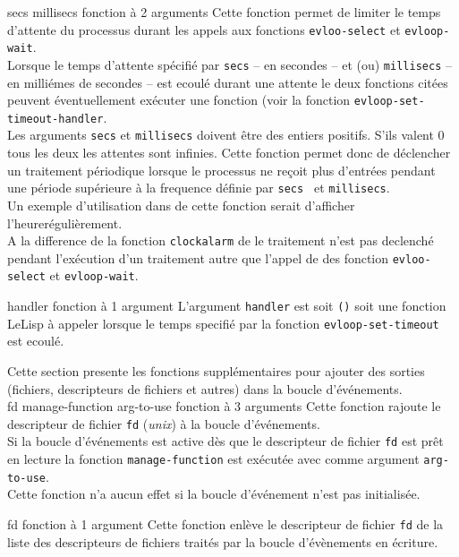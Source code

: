 {secs millisecs} {fonction \`{a} 2 arguments}
Cette fonction permet de limiter le temps d'attente du processus durant les
appels aux fonctions {\tt evloo-select} et {\tt evloop-wait}.\\
Lorsque le temps d'attente sp\'{e}cifi\'{e} par {\tt secs} -- en secondes -- et (ou)
{\tt millisecs} -- en milli\'{e}mes de secondes -- est ecoul\'{e} durant une attente
le deux fonctions cit\'{e}es peuvent \'{e}ventuellement ex\'{e}cuter une fonction
(voir la fonction {\tt evloop-set-timeout-handler}.\\
Les arguments {\tt secs} et {\tt millisecs} doivent \^{e}tre des entiers 
positifs. S'ils valent 0 tous les deux les attentes sont infinies.
Cette fonction permet donc de d\'{e}clencher un traitement p\'{e}riodique lorsque
le processus ne re\c{c}oit plus d'entr\'{e}es pendant une p\'{e}riode sup\'{e}rieure 
\`{a} la frequence d\'{e}finie par {\tt secs } et {\tt millisecs}.\\
Un exemple d'utilisation dans \Aida de cette fonction serait d'afficher l'heurer\'{e}guli\`{e}rement.\\
A la difference de la fonction {\tt clockalarm} de \LeLisp le traitement
n'est pas declench\'{e} pendant l'ex\'{e}cution d'un traitement autre que
l'appel de des fonction  {\tt evloo-select} et {\tt evloop-wait}.

 {handler} {fonction \`{a} 1 argument}
L'argument {\tt  handler} est soit {\tt ()} soit une fonction LeLisp \`{a}
appeler lorsque le temps specifi\'{e} par la fonction {\tt evloop-set-timeout}
est ecoul\'{e}.

Cette section presente les fonctions suppl\'{e}mentaires pour ajouter des 
sorties (fichiers, descripteurs de fichiers et autres) dans la boucle
d'\'{e}v\'{e}nements.\\
 {fd manage-function arg-to-use} {fonction \`{a} 3 arguments}
Cette fonction rajoute le descripteur de fichier {\tt fd} ({\em unix}) \`{a} la boucle d'\'{e}v\'{e}nements.\\
Si la boucle d'\'{e}v\'{e}nements est active d\`{e}s que le descripteur de fichier
{\tt fd} est pr\^{e}t en lecture la fonction 
{\tt manage-function} est ex\'{e}cut\'{e}e avec comme argument {\tt arg-to-use}.\\
Cette fonction n'a aucun effet si la boucle d'\'{e}v\'{e}nement n'est pas 
initialis\'{e}e.

 {fd} {fonction \`{a} 1 argument}
Cette fonction enl\`{e}ve  le descripteur de fichier {\tt fd} de la liste
des descripteurs de fichiers trait\'{e}s par la boucle d'\'{e}v\`{e}nements en \'{e}criture.\\

